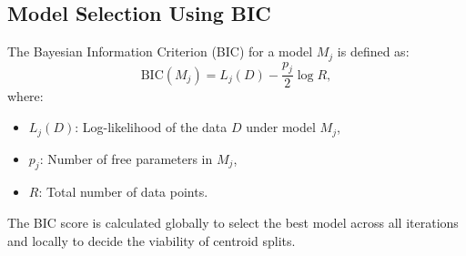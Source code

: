 \subsection*{Model Selection Using BIC}
The Bayesian Information Criterion (BIC) for a model \( M_j \) is defined as:
\[
\text{BIC}(M_j) = L_j(D) - \frac{p_j}{2} \log R,
\]
where:
\begin{itemize}
    \item \( L_j(D) \): Log-likelihood of the data \( D \) under model \( M_j \),
    \item \( p_j \): Number of free parameters in \( M_j \),
    \item \( R \): Total number of data points.
\end{itemize}
The BIC score is calculated globally to select the best model across all iterations and locally to decide the viability of centroid splits.
